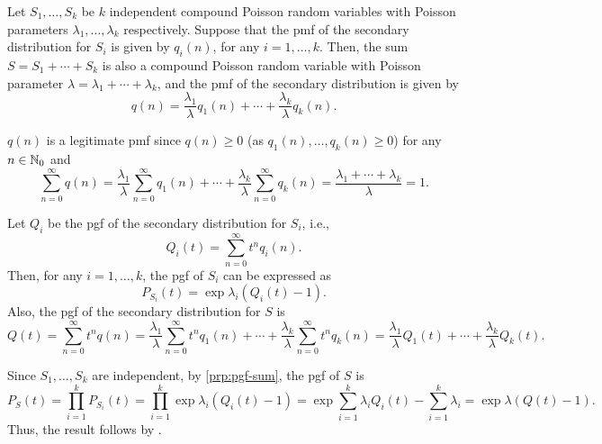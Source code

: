 \begin{enumerate}
\begin{theorem}
\label{thm:cpd-pois-convolution}
Let \(S_1,\dotsc,S_k\) be \(k\) independent compound Poisson random variables
with Poisson parameters \(\lambda_1,\dotsc,\lambda_k\) respectively. Suppose
that the pmf of the secondary distribution for \(S_i\) is given by \(q_i(n)\),
for any \(i=1,\dotsc,k\). Then, the sum \(S=S_1+\dotsb+S_k\) is also a compound
Poisson random variable with Poisson parameter
\(\lambda=\lambda_1+\dotsb+\lambda_k\), and the pmf of the secondary
distribution is given by
\[
q(n)=\frac{\lambda_1}{\lambda}q_1(n)+\dotsb+\frac{\lambda_k}{\lambda}q_k(n).
\]
\begin{note}
\(q(n)\) is a legitimate pmf since \(q(n)\ge 0\) (as \(q_1(n),\dotsc,q_k(n)\ge
0\)) for any \(n\in\mathbb{N}_0\) and
\[
\sum_{n=0}^{\infty}q(n)=\frac{\lambda_1}{\lambda}\sum_{n=0}^{\infty}q_1(n)+\dotsb+
\frac{\lambda_k}{\lambda}\sum_{n=0}^{\infty}q_k(n)
=\frac{\lambda_1+\dotsb+\lambda_k}{\lambda}=1.
\]
\end{note}
\end{theorem}
\begin{pf}
Let \(Q_i\) be the pgf of the secondary distribution for \(S_i\), i.e.,
\[
Q_i(t)=\sum_{n=0}^{\infty}t^nq_i(n).
\]
Then, for any \(i=1,\dotsc,k\), the pgf of \(S_i\) can be expressed as
\[
P_{S_i}(t)=\exp{\lambda_i(Q_i(t)-1)}.
\]
Also, the pgf of the secondary distribution for \(S\) is
\[
Q(t)=\sum_{n=0}^{\infty}t^nq(n)
=\frac{\lambda_1}{\lambda}\sum_{n=0}^{\infty}t^nq_1(n)
+\dotsb+\frac{\lambda_k}{\lambda}\sum_{n=0}^{\infty}t^nq_k(n)
=\frac{\lambda_1}{\lambda}Q_1(t)+\dotsb+\frac{\lambda_k}{\lambda}Q_k(t).
\]

Since \(S_1,\dotsc,S_k\) are independent, by \cref{prp:pgf-sum}, the pgf of
\(S\) is
\[
P_S(t)=\prod_{i=1}^{k}P_{S_i}(t)
=\prod_{i=1}^{k}\exp{\lambda_i(Q_i(t)-1)}
=\exp{\sum_{i=1}^{k}\lambda_iQ_i(t)-\sum_{i=1}^{k}\lambda_i}
=\exp{\lambda(Q(t)-1)}.
\]
Thus, the result follows by .
\end{pf}
\end{enumerate}
